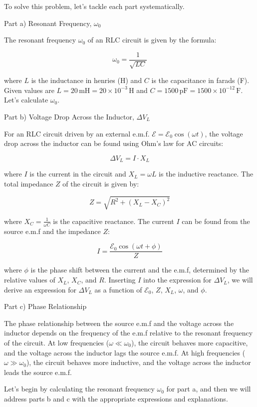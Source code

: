 \documentclass[a4paper,11pt]{article}
\begin{document}
To solve this problem, let's tackle each part systematically.

Part a) Resonant Frequency, \( \omega_{0} \)

The resonant frequency \(\omega_{0}\) of an RLC circuit is given by the formula:

\[ \omega_{0} = \frac{1}{\sqrt{LC}} \]

where \(L\) is the inductance in henries (H) and \(C\) is the capacitance in farads (F). Given values are \(L = 20 \, \text{mH} = 20 \times 10^{-3} \, \text{H}\) and \(C = 1500 \, \text{pF} = 1500 \times 10^{-12} \, \text{F}\). Let's calculate \(\omega_{0}\).

Part b) Voltage Drop Across the Inductor, \( \Delta V_{L} \)

For an RLC circuit driven by an external e.m.f. \(\mathcal{E} = \mathcal{E}_{0} \cos(\omega t)\), the voltage drop across the inductor can be found using Ohm's law for AC circuits:

\[ \Delta V_{L} = I \cdot X_{L} \]

where \(I\) is the current in the circuit and \(X_{L} = \omega L\) is the inductive reactance. The total impedance \(Z\) of the circuit is given by:

\[ Z = \sqrt{R^2 + (X_{L} - X_{C})^2} \]

where \(X_{C} = \frac{1}{\omega C}\) is the capacitive reactance. The current \(I\) can be found from the source e.m.f and the impedance \(Z\):

\[ I = \frac{\mathcal{E}_{0} \cos(\omega t + \phi)}{Z} \]

where \(\phi\) is the phase shift between the current and the e.m.f, determined by the relative values of \(X_{L}\), \(X_{C}\), and \(R\). Inserting \(I\) into the expression for \(\Delta V_{L}\), we will derive an expression for \(\Delta V_{L}\) as a function of \(\mathcal{E}_{0}\), \(Z\), \(X_{L}\), \(\omega\), and \(\phi\).

Part c) Phase Relationship

The phase relationship between the source e.m.f and the voltage across the inductor depends on the frequency of the e.m.f relative to the resonant frequency of the circuit. At low frequencies (\(\omega \ll \omega_{0}\)), the circuit behaves more capacitive, and the voltage across the inductor lags the source e.m.f. At high frequencies (\(\omega \gg \omega_{0}\)), the circuit behaves more inductive, and the voltage across the inductor leads the source e.m.f.

Let's begin by calculating the resonant frequency \(\omega_{0}\) for part a, and then we will address parts b and c with the appropriate expressions and explanations.
\end{document}

